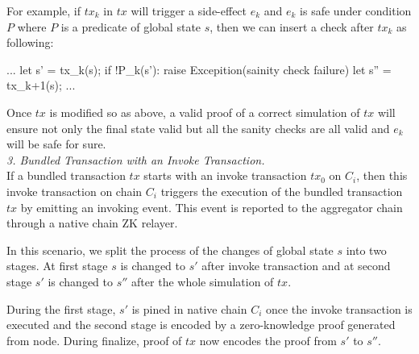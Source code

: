 For example, if $tx_k$ in $tx$ will trigger a side-effect $e_k$ and $e_k$ is safe under condition $P$ where $P$ is a predicate of global state $s$, then we can insert a check after $tx_k$ as following:

\begin{code}
...
let s' = tx_k(s);
if !P_k(s'):
    raise Excepition(sainity check failure)
let s'' = tx_{k+1}(s);
...
\end{code}
Once $tx$ is modified so as above, a valid proof of a correct simulation of $tx$ will ensure not only the final state valid but all the sanity checks are all valid and $e_k$ will be safe for sure.\\

\noindent\smallskip\emph{3. Bundled Transaction with an Invoke Transaction.}\\
If a bundled transaction $tx$ starts with an invoke transaction $tx_0$ on $C_i$, then this invoke transaction on chain $C_i$ triggers the execution of the bundled transaction $tx$ by emitting an invoking event. This event is reported to the aggregator chain through a native chain ZK relayer.


In this scenario, we split the process of the changes of global state $s$ into two stages. At first stage $s$ is changed to $s'$ after invoke transaction and at second stage $s'$ is changed to $s''$ after the whole simulation of $tx$.

During the first stage, $s'$ is pined in native chain $C_i$ once the invoke transaction is executed and the second stage is encoded by a zero-knowledge proof generated from \dprotocol node. During finalize, proof of $tx$ now encodes the proof from $s'$ to $s''$.


